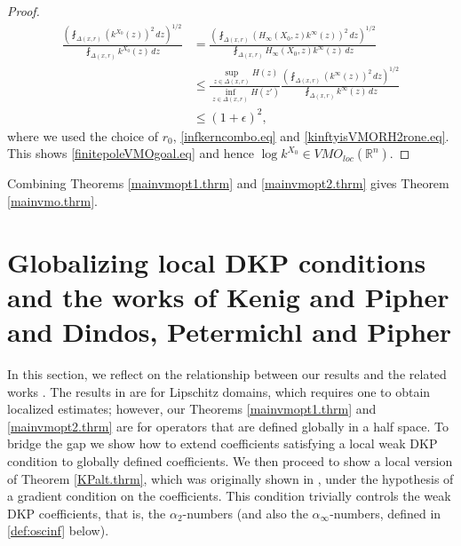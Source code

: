 \documentclass[11pt, a4paper,leqno]{amsart}
\theoremstyle{plain}
\theoremstyle{definition}
\theoremstyle{remark}
\numberwithin{equation}{section}
\newcommand{\rn}{\mathbb{R}^n}
\begin{document}
\begin{proof}
\begin{align*}
 \frac{\left(\fint_{\Delta(x,r)} (k^{X_0}(z))^2 \, dz \right)^{1/2}}{\fint_{\Delta(x,r)} k^{X_0}(z) \, dz} &=  \frac{\left(\fint_{\Delta(x,r)} (H_\infty(X_0, z) k^\infty(z))^2 \, dz \right)^{1/2}}{\fint_{\Delta(x,r)} H_\infty(X_0, z) k^\infty(z) \, dz}
 \\ & \le \frac{\sup_{z \in \Delta(x,r)}H(z)}{\inf_{z \in \Delta(x,r)}H(z')} \frac{\left(\fint_{\Delta(x,r)} (k^\infty(z))^2 \, dz \right)^{1/2}}{\fint_{\Delta(x,r)}  k^\infty(z) \, dz}
 \\ & \le (1 + \epsilon)^2,
 \end{align*}
where we used the choice of $r_0$, \eqref{infkerncombo.eq} and \eqref{kinftyisVMORH2rone.eq}. This shows \eqref{finitepoleVMOgoal.eq} and hence $\log k^{X_0} \in VMO_{loc}(\rn)$.
\end{proof}

Combining Theorems \ref{mainvmopt1.thrm} and \ref{mainvmopt2.thrm} gives Theorem \ref{mainvmo.thrm}.


\section{Globalizing local DKP conditions and the works of Kenig and Pipher and Dindos, Petermichl and Pipher}\label{kpdpp.sect}

In this section, we reflect on the relationship between our results and the related works \cite{KP,DPP}. %
The results in \cite{KP,DPP} are for Lipschitz domains, which requires one to obtain localized estimates; however, our Theorems \ref{mainvmopt1.thrm} and \ref{mainvmopt2.thrm} are for operators that are defined globally in a half space. To bridge the gap we show how to extend coefficients satisfying a local weak DKP condition to globally defined coefficients. We then proceed to show a local version of Theorem \ref{KPalt.thrm}, which was originally shown in \cite{KP}, under the hypothesis of a gradient condition on the coefficients. This condition trivially controls the weak DKP coefficients, that is, the $\alpha_2$-numbers (and also the $\alpha_\infty$-numbers, defined in \eqref{def:oscinf} below).
\end{document}
